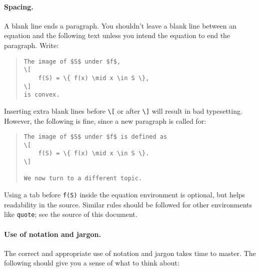 \documentclass[12pt]{article}
\begin{document}
\paragraph{Spacing.}
A blank line ends a paragraph. You shouldn't leave a blank line between an
equation and the following text unless you intend the equation to end the
paragraph. Write:
\begin{quote}
\begin{verbatim}
The image of $S$ under $f$,
\[
    f(S) = \{ f(x) \mid x \in S \},
\]
is convex.
\end{verbatim}
\end{quote}
Inserting extra blank lines before \verb|\[| or after \verb|\]| will result in
bad typesetting. However, the following is fine, since a new paragraph is called for:
\begin{quote}
\begin{verbatim}
The image of $S$ under $f$ is defined as
\[
    f(S) = \{ f(x) \mid x \in S \}.
\]

We now turn to a different topic.
\end{verbatim}
\end{quote}
Using a tab before \verb|f(S)| inside the equation environment is
optional, but helps readability in the source.  Similar rules should be
followed for other environments like \texttt{quote}; see the source of this
document.

\paragraph{Use of notation and jargon.}
The correct and appropriate use of notation and jargon takes time to master.
The following should give you a sense of what to think about:
\end{document}
